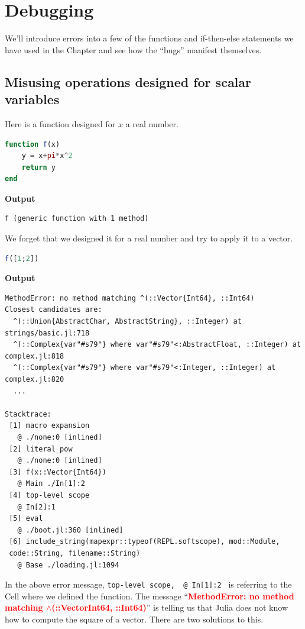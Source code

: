 \section{Debugging}

We'll introduce errors into a few of the functions and if-then-else statements we have used in the Chapter and see how the ``bugs''  manifest themselves. \\

\subsection{Misusing operations designed for scalar variables}
Here is a function designed for $x$ a real number.

\begin{lstlisting}[language=Julia,style=mystyle]
function f(x)
    y = x+pi*x^2
    return y
end
\end{lstlisting}
\textbf{Output} 
\begin{verbatim}
f (generic function with 1 method)
\end{verbatim}

We forget that we designed it for a real number and try to apply it to a vector.

\begin{lstlisting}[language=Julia,style=mystyle]
f([1;2])
\end{lstlisting}
\textbf{Output} 
\begin{verbatim}
MethodError: no method matching ^(::Vector{Int64}, ::Int64)
Closest candidates are:
  ^(::Union{AbstractChar, AbstractString}, ::Integer) at strings/basic.jl:718
  ^(::Complex{var"#s79"} where var"#s79"<:AbstractFloat, ::Integer) at complex.jl:818
  ^(::Complex{var"#s79"} where var"#s79"<:Integer, ::Integer) at complex.jl:820
  ...

Stacktrace:
 [1] macro expansion
   @ ./none:0 [inlined]
 [2] literal_pow
   @ ./none:0 [inlined]
 [3] f(x::Vector{Int64})
   @ Main ./In[1]:2
 [4] top-level scope
   @ In[2]:1
 [5] eval
   @ ./boot.jl:360 [inlined]
 [6] include_string(mapexpr::typeof(REPL.softscope), mod::Module, 
 code::String, filename::String)
   @ Base ./loading.jl:1094

\end{verbatim}

In the above error message, \texttt{top-level scope, ~@ In[1]:2 } is referring to the Cell where we defined the function. The message ``\textcolor{red}{\bf MethodError: no method matching $ \wedge $(::Vector{Int64}, ::Int64)}'' is telling us that Julia does not know how to compute the square of a vector. There are two solutions to this. 


